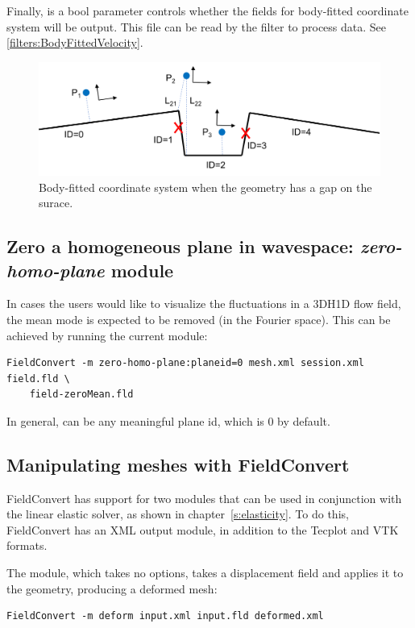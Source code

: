 Finally,  is a bool parameter controls whether the fields for body-fitted 
coordinate system will be output. This file can be read by the 
filter to process data. See \ref{filters:BodyFittedVelocity}.
%
\begin{figure}[!htbp]
  \begin{center}
    \includegraphics[width = 0.9 \textwidth]{img/module_bodyFittedVelocity.png}
    \caption{Body-fitted coordinate system when the geometry has a gap on the surace.}
  \end{center}
\end{figure}
%
%
%

\subsection{Zero a homogeneous plane in wavespace: \textit{zero-homo-plane} module}
\label{s:utilities:fieldconvert:sub:zero-homo-plane}
In cases the users would like to visualize the fluctuations in a 3DH1D flow
field, the mean mode is expected to be removed (in the Fourier space). This can 
be achieved by running the current module:
\begin{lstlisting}[style=BashInputStyle]
FieldConvert -m zero-homo-plane:planeid=0 mesh.xml session.xml field.fld \
    field-zeroMean.fld
\end{lstlisting}

In general,  can be any meaningful plane id, which is 0 by 
default. 

%
%
%

\subsection{Manipulating meshes with FieldConvert}
FieldConvert has support for two modules that can be used in conjunction with
the linear elastic solver, as shown in chapter~\ref{s:elasticity}. To do this,
FieldConvert has an XML output module, in addition to the Tecplot and VTK
formats.

The  module, which takes no options, takes a displacement field
and applies it to the geometry, producing a deformed mesh:
\begin{lstlisting}[style=BashInputStyle]
FieldConvert -m deform input.xml input.fld deformed.xml
\end{lstlisting}

